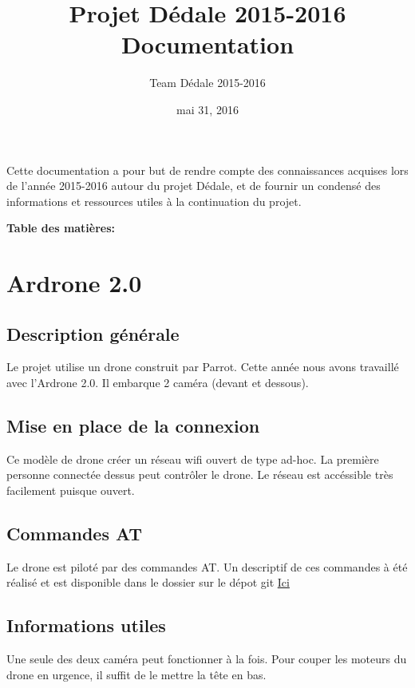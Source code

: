 \documentclass[letterpaper,10pt,french]{sphinxmanual}
\title{Projet Dédale 2015-2016 Documentation}
\date{mai 31, 2016}
\author{Team Dédale 2015-2016}
\begin{document}
\maketitle
\tableofcontents
{}\label{index::doc}


Cette documentation a pour but de rendre compte des connaissances acquises lors de l'année 2015-2016 autour du projet
Dédale, et de fournir un condensé des informations et ressources utiles à la continuation du projet.

\textbf{Table des matières:}


\chapter{Ardrone 2.0}
\label{ardrone::doc}\label{ardrone:ardrone-2-0}\label{ardrone:ressources-du-projet-dedale-2015-2016}

\section{Description générale}
\label{ardrone:description-generale}
Le projet utilise un drone construit par Parrot. Cette année nous avons travaillé avec l'Ardrone 2.0.
Il embarque 2 caméra (devant et dessous).


\section{Mise en place de la connexion}
\label{ardrone:mise-en-place-de-la-connexion}
Ce modèle de drone créer un réseau wifi ouvert de type ad-hoc. La première personne connectée dessus peut contrôler le drone.
Le réseau est accéssible très facilement puisque ouvert.


\section{Commandes AT}
\label{ardrone:commandes-at}
Le drone est piloté par des commandes AT. Un descriptif de ces commandes à été réalisé et est disponible dans le dossier
 sur le dépot git \href{https://github.com/DedaleTSP/Resources20152016}{Ici}


\section{Informations utiles}
\label{ardrone:informations-utiles}
Une seule des deux caméra peut fonctionner à la fois. Pour couper les moteurs du drone en urgence, il suffit de
le mettre la tête en bas.
\end{document}
